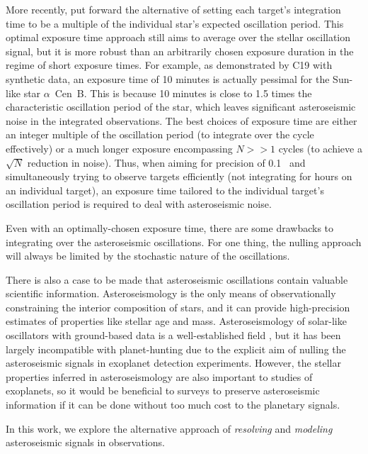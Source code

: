 \documentclass[modern]{aastex62}
\begin{document}
More recently, \citet[][hereafter C19]{Chaplin2019} put forward the alternative of setting each target's integration time to be a multiple of the individual star's expected oscillation period. 
This optimal exposure time approach still aims to average over the stellar oscillation signal, but it is more robust than an arbitrarily chosen exposure duration in the regime of short exposure times. 
For example, as demonstrated by C19 with synthetic data, an exposure time of 10 minutes is actually pessimal for the Sun-like star $\alpha$~Cen~B. 
This is because 10 minutes is close to 1.5 times the characteristic oscillation period of the star, which leaves significant asteroseismic noise in the integrated \RV observations. 
The best choices of exposure time are either an integer multiple of the oscillation period (to integrate over the cycle effectively) or a much longer exposure encompassing $N>>1$ cycles (to achieve a $\sqrt{N}$ reduction in noise). 
Thus, when aiming for \RV precision of 0.1 \ms\ and simultaneously trying to observe targets efficiently (\ie not integrating for hours on an individual target), an exposure time tailored to the individual target's oscillation period is required to deal with asteroseismic noise.

Even with an optimally-chosen exposure time, there are some drawbacks to integrating over the asteroseismic oscillations. 
For one thing, the nulling approach will always be limited by the stochastic nature of the oscillations. 

There is also a case to be made that asteroseismic oscillations contain valuable scientific information. 
Asteroseismology is the only means of observationally constraining the interior composition of stars, and it can provide high-precision estimates of properties like stellar age and mass. 
Asteroseismology of solar-like oscillators with ground-based \RV data is a well-established field \citep[see e.g.][for a review]{Bedding2003}, but it has been largely incompatible with \RV planet-hunting due to the explicit aim of nulling the asteroseismic signals in exoplanet detection experiments. 
However, the stellar properties inferred in asteroseismology are also important to studies of exoplanets, so it would be beneficial to \EPRV surveys to preserve asteroseismic information if it can be done without too much cost to the planetary signals.

In this work, we explore the alternative approach of \textit{resolving} and \textit{modeling} asteroseismic signals in \EPRV observations. 
\end{document}
